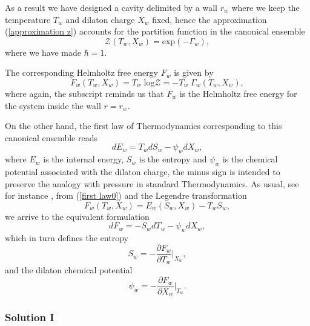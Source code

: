 \documentclass[sn-mathphys,Numbered]{sn-jnl}%
\theoremstyle{thmstyleone}%
\theoremstyle{thmstyletwo}%
\theoremstyle{thmstylethree}%
\begin{document}
As a result we have designed a cavity delimited by a wall $r_w$ where we keep the temperature $T_w$ and dilaton charge $X_w$ fixed, hence the approximation (\ref{approximation z}) accounts for  the partition function in the canonical ensemble
%
\begin{equation} \label{z with Gamma}
\mathcal{Z}(T_w, X_w)=\text{exp}\left(-\Gamma_w\right),
\end{equation}
%
where we have made $\hbar=1$. 

The corresponding  Helmholtz free energy $F_w$ is given by
%
\begin{equation}\label{free energy 1}
 F_w(T_w, X_w)= T_w\;\text{log}\mathcal{Z}=-T_w\; \Gamma_w(T_w, X_w),
\end{equation}
where again, the subscript reminds us that $F_w$ is the Helmholtz free energy for the system inside the wall $r=r_w$. 

On the other hand, the first law of Thermodynamics corresponding to this canonical ensemble reads
\begin{equation}\label{first law0}
    dE_w=T_w dS_w - \psi_w dX_w,
\end{equation}
where $E_w$ is the internal energy, $S_w$ is the entropy and $\psi_w$ is the chemical potential associated with the dilaton charge, the minus sign is intended to preserve the analogy with pressure in standard Thermodynamics. As usual, see for instance \cite{Reif}, from (\ref{first law0}) and the Legendre transformation 
%
\begin{equation}\label{Legendre trans}
    F_w(T_w,X_w) = E_w(S_w,X_w) - T_w S_w,
\end{equation}
%
we arrive to the equivalent formulation
\begin{equation}
    dF_w=-S_w dT_w-\psi_w dX_w,
\end{equation}
which in turn defines the entropy 
%
\begin{equation}\label{entropy def}
    S_w=-\frac{\partial F_w}{\partial T_w}\bigg\rvert_{X_w},
\end{equation}
and the dilaton chemical potential 
%
\begin{equation}\label{chemical potential0}
    \psi_w=-\frac{\partial F_w}{\partial X_w}\bigg\rvert_{T_w}.
\end{equation}

\subsubsection{Solution I}
\end{document}
